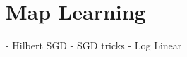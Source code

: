 
\section{Map Learning}
\citet{ramos2016hilbert} - Hilbert SGD 
\citet{bottou2012stochastic} - SGD tricks
\citet{tsuruoka2009stochastic} - Log Linear